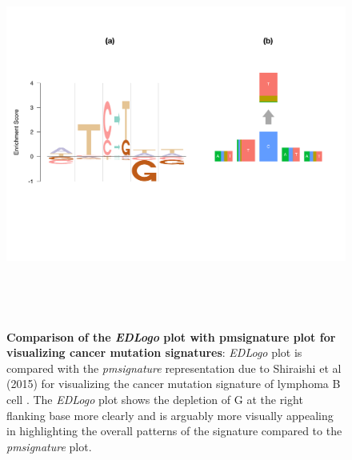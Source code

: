 \documentclass{bmcart}
\begin{document}
\begin{figure}[h!]
\centering
\includegraphics[height=5in, width=5in]{suppfig/Figure3.pdf}
\caption{\textbf{Comparison of the \textit{EDLogo} plot with pmsignature plot for visualizing cancer mutation signatures}: 
 \textit{EDLogo} plot is compared with the \textit{pmsignature} representation due to Shiraishi et al (2015) \cite{Shiraishi2015} for visualizing the cancer mutation signature of lymphoma B cell \cite{Alexandrov2013}. The \textit{EDLogo} plot shows the depletion of G at the right flanking base more clearly and is arguably more visually appealing in highlighting the overall patterns of the signature compared to the \textit{pmsignature} plot.}
\label{fig:suppfig3}
\end{figure}
\end{document}
